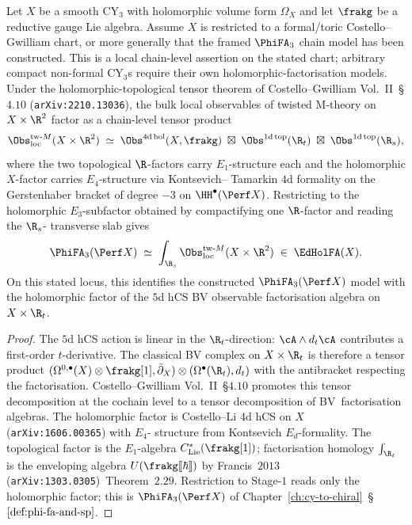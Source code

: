 \begin{theorem}
\label{thm:E3-chain-level-twisted-M-theory}
Let $X$ be a smooth CY$_3$ with holomorphic volume form $\Omega_X$ and
let $\frakg$ be a reductive gauge Lie algebra. Assume $X$ is restricted
to a formal/toric Costello--Gwilliam chart, or more generally that the
framed $\PhiFA_3$ chain model has been constructed. This is a local
chain-level assertion on the stated chart; arbitrary compact non-formal
CY$_3$s require their own holomorphic-factorisation models. Under the
holomorphic-topological tensor theorem of Costello--Gwilliam Vol.~II~\S$4.10$
\textup{(}\texttt{arXiv:2210.13036}\textup{),} the bulk local
observables of twisted M-theory on $X \times \R^2$ factor as a
chain-level tensor product
\[
 \Obs^{\mathrm{tw}\text{-}M}_{\mathrm{loc}}(X \times \R^2)
 \;\simeq\;
 \Obs^{4\mathrm{d\,hol}}(X, \frakg)
 \;\boxtimes\;
 \Obs^{1\mathrm{d\,top}}(\R_t)
 \;\boxtimes\;
 \Obs^{1\mathrm{d\,top}}(\R_s),
\]
where the two topological $\R$-factors carry $E_1$-structure each and
the holomorphic $X$-factor carries $E_4$-structure via Kontsevich--
Tamarkin $4$d formality on the Gerstenhaber bracket of degree $-3$ on
$\HH^\bullet(\Perf X)$. Restricting to the holomorphic $E_3$-subfactor
obtained by compactifying one $\R$-factor and reading the $\R_s$-
transverse slab gives
\[
 \PhiFA_3(\Perf X)
 \;\simeq\;
 \int_{\R_s} \Obs^{\mathrm{tw}\text{-}M}_{\mathrm{loc}}(X \times \R^2)
 \;\in\;
 \EdHolFA(X).
\]
On this stated locus, this identifies the constructed
$\PhiFA_3(\Perf X)$ model with the holomorphic factor of the $5$d hCS
BV observable factorisation algebra on $X \times \R_t$.
\end{theorem}

\begin{proof}
The $5$d hCS action is linear in the $\R_t$-direction: $\cA \wedge d_t
\cA$ contributes a first-order $t$-derivative. The classical BV complex
on $X \times \R_t$ is therefore a tensor product
$(\Omega^{0,\bullet}(X) \otimes \frakg[1], \bar{\partial}_X) \otimes
(\Omega^\bullet(\R_t), d_t)$ with the antibracket respecting the
factorisation. Costello--Gwilliam Vol.~II~\S$4.10$ promotes this tensor
decomposition at the cochain level to a tensor decomposition of
BV~factorisation algebras. The holomorphic factor is Costello--Li $4$d
hCS on $X$ \textup{(}\texttt{arXiv:1606.00365}\textup{)} with $E_4$-
structure from Kontsevich $E_d$-formality. The topological factor is
the $E_1$-algebra $C^*_{\mathrm{Lie}}(\frakg[1])$; factorisation homology
$\int_{\R_t}$ is the enveloping algebra $U(\frakg[\![\hbar]\!])$ by
Francis~$2013$ \textup{(}\texttt{arXiv:1303.0305}\textup{)}~Theorem~$2.29$.
Restriction to Stage-$1$ reads only the holomorphic factor; this is
$\PhiFA_3(\Perf X)$ of Chapter~\ref{ch:cy-to-chiral}~\S$\ref{def:phi-fa-and-sp}$.
\end{proof}


